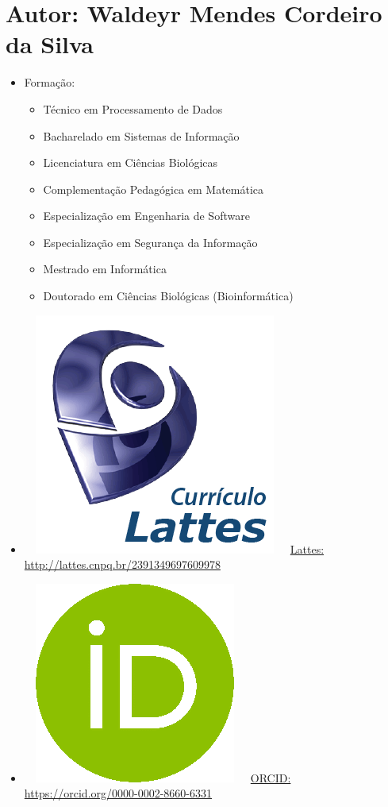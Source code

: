 \documentclass[11pt,fleqn]{book} %
\begin{document}
\section*{Autor: Waldeyr Mendes Cordeiro da Silva}\label{WaldeyrMendes}
\begin{itemize}
	\item Formação:
	\begin{itemize}
		\item Técnico em Processamento de Dados
		\item Bacharelado em Sistemas de Informação
		\item Licenciatura em Ciências Biológicas
		\item Complementação Pedagógica em Matemática
		\item Especialização em Engenharia de Software
		\item Especialização em Segurança da Informação
		\item Mestrado em Informática
		\item Doutorado em Ciências Biológicas (Bioinformática)
	\end{itemize}
	\item~~\includegraphics[scale=.03]{Pictures/lattes}~~~\href{http://lattes.cnpq.br/2391349697609978}{Lattes: http://lattes.cnpq.br/2391349697609978}
	\item~~\includegraphics[scale=.15]{Pictures/orcid}~~~\href{https://orcid.org/0000-0002-8660-6331}{ORCID: https://orcid.org/0000-0002-8660-6331}

\end{itemize}
\end{document}
